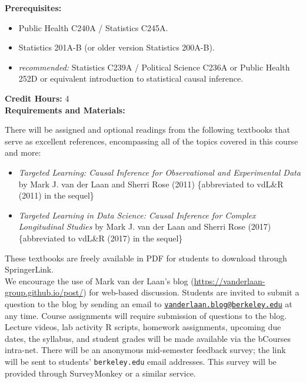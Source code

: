 \documentclass[11pt]{article}
\begin{document}
\newpage

\textbf {Prerequisites:}
\begin{itemize} \itemsep-0.5em
  \item Public Health C240A / Statistics C245A.
  \item Statistics 201A-B (or older version Statistics 200A-B).
  \item \textit{recommended:} Statistics C239A / Political Science C236A or
    Public Health 252D or equivalent introduction to statistical causal
    inference.
\end{itemize}

\textbf {Credit Hours:} 4 \\

\textbf {\large Requirements and Materials:}

There will be assigned and optional readings from the following textbooks that
serve as excellent references, encompassing all of the topics covered in this
course and more:
\begin{itemize}
  \item \textit{Targeted Learning: Causal Inference for Observational and
    Experimental Data} by Mark J. van der Laan and Sherri Rose (2011)
    \{abbreviated to vdL\&R (2011) in the sequel\}
  \item \textit{Targeted Learning in Data Science: Causal Inference for Complex
    Longitudinal Studies} by Mark J. van der Laan and Sherri Rose (2017)
    \{abbreviated to vdL\&R (2017) in the sequel\}
\end{itemize}

These textbooks are freely available in PDF for students to download through
SpringerLink. \\

We encourage the use of Mark van der Laan's blog
(\url{https://vanderlaan-group.github.io/post/}) for web-based discussion.
Students are invited to submit a question to the blog by sending an email to
\href{mailto:vanderlaan.blog@berkeley.edu}{
\texttt{vanderlaan.blog@berkeley.edu}} at any time. Course assignments will
require submission of questions to the blog. \\

Lecture videos, lab activity R scripts, homework assignments, upcoming due
dates, the syllabus, and student grades will be made available via the bCourses
intra-net. There will be an anonymous mid-semester feedback survey; the link
will be sent to students' \texttt{berkeley.edu} email addresses. This survey
will be provided through SurveyMonkey or a similar service. \\
\end{document}
